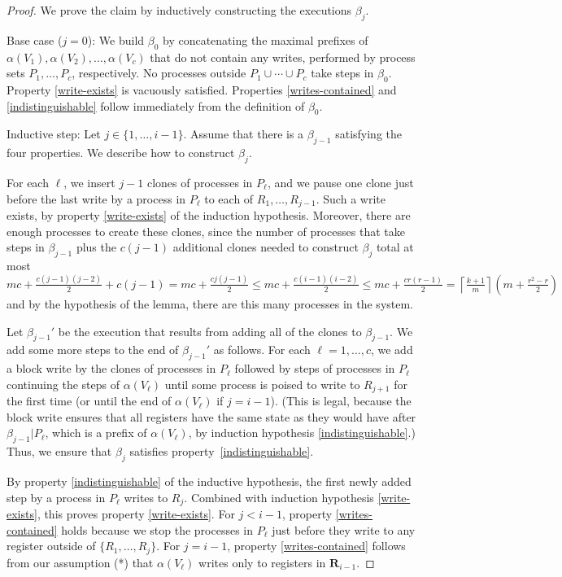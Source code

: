 \documentclass[11pt]{article}
\newcommand{\bR}{\mathbf{R}}
\newcommand{\ceil}[1]{\left\lceil #1 \right\rceil}
\newcounter{ind}
\begin{document}
\begin{proof}
We prove the claim by inductively constructing the executions $\beta_j$.

{\sc Base case} ($j=0$):  We build $\beta_0$ by concatenating the maximal prefixes of $\alpha(V_1), \alpha(V_2), \ldots, \alpha(V_c)$ that do not contain any writes, performed by process sets $P_1, \ldots, P_c$, respectively.
No processes outside $P_1\cup \cdots\cup P_c$ take steps in $\beta_0$.
Property \ref{write-exists} is vacuously satisfied.  Properties \ref{writes-contained} and \ref{indistinguishable} follow 
immediately from the definition of $\beta_0$.

{\sc Inductive step}:  Let $j\in \{1,\ldots,i-1\}$.  Assume that there is a $\beta_{j-1}$ satisfying the four properties.
We describe how to construct $\beta_j$.

For each $\ell$, we insert $j-1$ clones of processes in $P_\ell$,
and we pause one clone just before the last write by a process in $P_\ell$ to each of $R_1,\ldots,R_{j-1}$.  Such a write exists, by property \ref{write-exists} of the induction hypothesis.
Moreover, there are enough processes to create these clones, since the number of processes that take steps in $\beta_{j-1}$ plus the $c(j-1)$ additional clones needed to construct $\beta_j$ total at most 
$mc+\frac{c(j-1)(j-2)}{2} + c(j-1) = mc + \frac{cj(j-1)}{2} \leq mc + \frac{c(i-1)(i-2)}{2} \leq mc+\frac{cr(r-1)}{2} = \ceil{\frac{k+1}{m}}(m+\frac{r^2-r}{2})$ and by the hypothesis of the lemma, there are this many processes in the system.

Let $\beta_{j-1}'$ be the execution that results from adding all of the clones to $\beta_{j-1}$.
We add some more steps to the end of $\beta_{j-1}'$ as follows.
For each $\ell = 1,\ldots, c$, we add a block write by the clones of processes in $P_\ell$
followed by steps of processes in $P_\ell$ continuing the steps of $\alpha(V_\ell)$ until
some process is poised to write to $R_{j+1}$ for the first time (or until the end of $\alpha(V_\ell)$ if $j=i-1$).  (This is legal, because the block write ensures that all
registers have the same state as they would have after $\beta_{j-1}|P_\ell$, which is a prefix of $\alpha(V_\ell)$, by induction hypothesis \ref{indistinguishable}.)  Thus, we ensure that $\beta_j$ satisfies property~\ref{indistinguishable}.

By property \ref{indistinguishable} of the inductive hypothesis, the first newly added step by a process in $P_\ell$ writes to $R_j$.  Combined with induction hypothesis \ref{write-exists}, this proves property \ref{write-exists}.
For $j<i-1$, property \ref{writes-contained} holds because we stop the processes in
$P_\ell$ just before they write to any register outside of $\{R_1, \ldots, R_j\}$.
For $j=i-1$, property \ref{writes-contained} follows from our assumption (*) that $\alpha(V_\ell)$ writes only to registers in $\bR_{i-1}$.


\end{proof}
\end{document}
